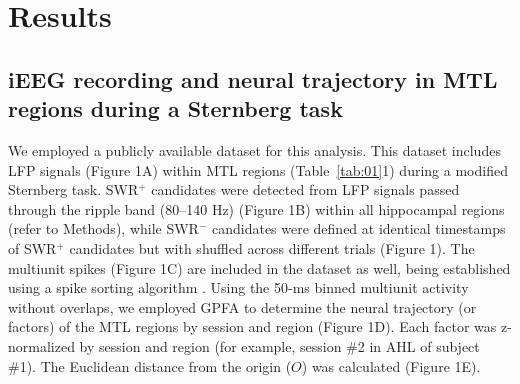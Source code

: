 \section{Results}
\subsection{iEEG recording and neural trajectory in MTL regions during a Sternberg task}
We employed a publicly available dataset \cite{boran_dataset_2020} for this analysis. This dataset includes LFP signals (Figure 1A) within MTL regions (Table~\ref{tab:01}1) during a modified Sternberg task. SWR$^+$ candidates were detected from LFP signals passed through the ripple band (80--140 Hz) (Figure 1B) within all hippocampal regions (refer to Methods), while SWR$^-$ candidates were defined at identical timestamps of SWR$^+$ candidates but with shuffled across different trials (Figure 1). The multiunit spikes (Figure 1C) are included in the dataset as well, being established using a spike sorting algorithm \cite{niediek_reliable_2016}. Using the 50-ms binned multiunit activity without overlaps, we employed GPFA \cite{yu_gaussian-process_2009} to determine the neural trajectory (or factors) of the MTL regions by session and region (Figure 1D). Each factor was z-normalized by session and region (for example, session \#2 in AHL of subject \#1). The Euclidean distance from the origin ($O$) was calculated (Figure 1E).

